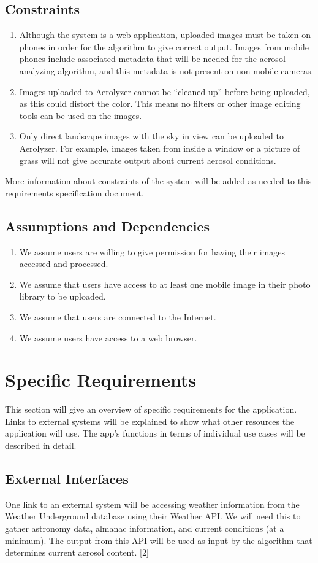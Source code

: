 \documentclass[letterpaper,10pt,draftclsnofoot,onecolumn]{IEEEtran}
\begin{document}
\begin{flushleft}
\subsection{Constraints}
\begin{enumerate}
	\item Although the system is a web application, uploaded images must be taken on phones in order for the algorithm to give correct output. Images from mobile phones include associated metadata that will be needed for the aerosol analyzing algorithm, and this metadata is not present on non-mobile cameras.
	\item Images uploaded to Aerolyzer cannot be “cleaned up” before being uploaded, as this could distort the color. This means no filters or other image editing tools can be used on the images. 
	\item Only direct landscape images with the sky in view can be uploaded to Aerolyzer. For example, images taken from inside a window or a picture of grass will not give accurate output about current aerosol conditions. 
\end{enumerate}
More information about constraints of the system will be added as needed to this requirements specification document.
\subsection{Assumptions and Dependencies}
\begin{enumerate}
	\item We assume users are willing to give permission for having their images accessed and processed.
	\item We assume that users have access to at least one mobile image in their photo library to be uploaded.
	\item We assume that users are connected to the Internet.
	\item We assume users have access to a web browser.
\end{enumerate}

\section{Specific Requirements}
This section will give an overview of specific requirements for the application. 
Links to external systems will be explained to show what other resources the application will use.
The app's functions in terms of individual use cases will be described in detail.

\subsection{External Interfaces}
One link to an external system will be accessing weather information from the Weather Underground database using their Weather API.  
We will need this to gather astronomy data, almanac information, and current conditions (at a minimum). 
The output from this API will be used as input by the algorithm that determines current aerosol content. [2]


\end{flushleft}
\end{document}
